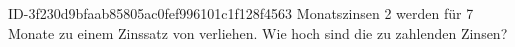 \begin{exercise}
      {ID-3f230d9bfaab85805ac0fef996101c1f128f4563}
      {Monatszinsen 2}
  \ifproblem\problem
     werden für \num{7} Monate zu einem Zinssatz von 
    verliehen. Wie hoch sind die zu zahlenden Zinsen?
  \fi
\end{exercise}
